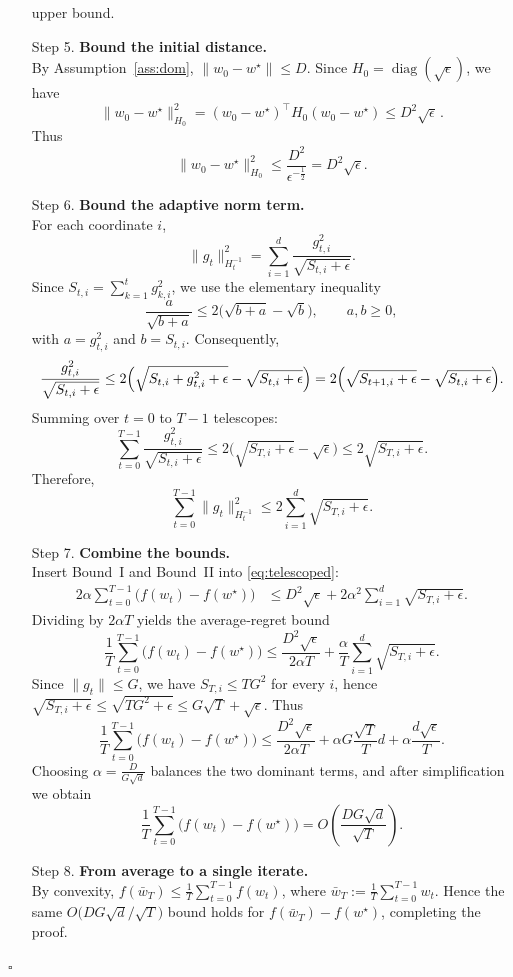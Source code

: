 \documentclass{article}
\begin{document}
\begin{enumerate}
upper bound.
\item[Step 5.] \textbf{Bound the initial distance.}\\
By Assumption~\ref{ass:dom}, $\|w_0-w^{\star}\|\le D$.
Since $H_0=\operatorname{diag}(\sqrt{\epsilon})$, we have
\[
    \|w_0-w^{\star}\|_{H_0}^2
    = (w_0-w^{\star})^{\!\top} H_0 (w_0-w^{\star})
    \le D^2\sqrt{\epsilon}\, .
\]
Thus
\[
    \|w_0-w^{\star}\|_{H_0}^2 \le \frac{D^2}{\epsilon^{-\frac12}}
    = D^2\sqrt{\epsilon}.
    \tag{Bound\,I}
\]
\item[Step 6.] \textbf{Bound the adaptive norm term.}\\
For each coordinate $i$,
\[
    \|g_t\|_{H_t^{-1}}^2
    = \sum_{i=1}^{d}\frac{g_{t,i}^2}{\sqrt{S_{t,i}+\epsilon}} .
\]
Since $S_{t,i}=\sum_{k=1}^{t}g_{k,i}^2$, we use the elementary inequality
\[
    \frac{a}{\sqrt{b+a}}\le 2\bigl(\sqrt{b+a}-\sqrt{b}\bigr),\qquad a,b\ge0,
\]
with $a=g_{t,i}^2$ and $b=S_{t,i}$. Consequently,
\[
    \frac{g_{t,i}^2}{\sqrt{S_{t,i}+\epsilon}}
    \le 2\Bigl(\sqrt{S_{t,i}+g_{t,i}^2+\epsilon}
               -\sqrt{S_{t,i}+\epsilon}\Bigr)
    = 2\Bigl(\sqrt{S_{t+1,i}+\epsilon}
               -\sqrt{S_{t,i}+\epsilon}\Bigr).
\]
Summing over $t=0$ to $T-1$ telescopes:
\[
    \sum_{t=0}^{T-1}\frac{g_{t,i}^2}{\sqrt{S_{t,i}+\epsilon}}
    \le 2\bigl(\sqrt{S_{T,i}+\epsilon}-\sqrt{\epsilon}\bigr)
    \le 2\sqrt{S_{T,i}+\epsilon}.
\]
Therefore,
\[
    \sum_{t=0}^{T-1}\|g_t\|_{H_t^{-1}}^2
    \le 2\sum_{i=1}^{d}\sqrt{S_{T,i}+\epsilon}.
    \tag{Bound\,II}
\]
\item[Step 7.] \textbf{Combine the bounds.}\\
Insert Bound~I and Bound~II into \eqref{eq:telescoped}:
\begin{align}
2\alpha\sum_{t=0}^{T-1}\bigl(f(w_t)-f(w^{\star})\bigr)
&\le D^2\sqrt{\epsilon}
   +2\alpha^2\sum_{i=1}^{d}\sqrt{S_{T,i}+\epsilon}.
\end{align}
Dividing by $2\alpha T$ yields the average‑regret bound
\[
\frac{1}{T}\sum_{t=0}^{T-1}\bigl(f(w_t)-f(w^{\star})\bigr)
\le \frac{D^2\sqrt{\epsilon}}{2\alpha T}
   +\frac{\alpha}{T}\sum_{i=1}^{d}\sqrt{S_{T,i}+\epsilon}.
\]
Since $\|g_t\|\le G$, we have $S_{T,i}\le TG^2$ for every $i$,
hence $\sqrt{S_{T,i}+\epsilon}\le \sqrt{TG^2+\epsilon}\le G\sqrt{T}+ \sqrt{\epsilon}$.
Thus
\[
\frac{1}{T}\sum_{t=0}^{T-1}\bigl(f(w_t)-f(w^{\star})\bigr)
\le \frac{D^2\sqrt{\epsilon}}{2\alpha T}
   +\alpha G\frac{\sqrt{T}}{T}d
   +\alpha\frac{d\sqrt{\epsilon}}{T}.
\]
Choosing $\alpha = \frac{D}{G\sqrt{d}}$ balances the two dominant terms,
and after simplification we obtain
\[
\frac{1}{T}\sum_{t=0}^{T-1}\bigl(f(w_t)-f(w^{\star})\bigr)
= O\!\left(\frac{DG\sqrt{d}}{\sqrt{T}}\right).
\]
\item[Step 8.] \textbf{From average to a single iterate.}\\
By convexity, $f(\bar w_T)\le\frac1T\sum_{t=0}^{T-1}f(w_t)$, where
$\bar w_T:=\frac1T\sum_{t=0}^{T-1}w_t$.
Hence the same $O\bigl(DG\sqrt{d}/\sqrt{T}\bigr)$ bound holds for
$f(\bar w_T)-f(w^{\star})$, completing the proof.
\end{enumerate}
\hfill $\square$
\end{document}
